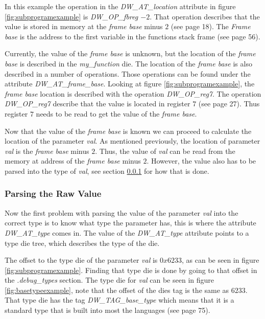 In this example the operation in the \emph{DW\_AT\_location} attribute in figure \ref{fig:subprogramexample} is \emph{DW\_OP\_fbreg $-2$}.
That operation describes that the value is stored in memory at the \emph{frame base} minus $2$ (see \cite{dwarf} page 18).
The \emph{Frame base} is the address to the first variable in the functions stack frame (see \cite{dwarf} page 56).


Currently, the value of the \emph{frame base} is unknown, but the location of the \emph{frame base}  is described in the \emph{my\_function} \gls{die}.
The location of the \emph{frame base} is also described in a number of operations.
Those operations can be found under the attribute \emph{DW\_AT\_frame\_base}.
Looking at figure \ref{fig:subprogramexample}, the \emph{frame base} location is described with the operation \emph{DW\_OP\_reg7}.
The operation \emph{DW\_OP\_reg7} describe that the value is located in register $7$ (see \cite{dwarf} page 27).
Thus register $7$ needs to be read to get the value of the \emph{frame base}.


Now that the value of the \emph{frame base} is known we can proceed to calculate the location of the parameter \emph{val}.
As mentioned previously, the location of parameter \emph{val} is the \emph{frame base} minus $2$.
Thus, the value of \emph{val} can be read from the memory at address of the \emph{frame base} minus $2$.
However, the value also has to be parsed into the type of \emph{val}, see section \ref{sec:parsingvalue} for how that is done.


\subsubsection{Parsing the Raw Value} \label{sec:parsingvalue}
Now the first problem with parsing the value of the parameter \emph{val} into the correct type is to know what type the parameter has, this is where the attribute \emph{DW\_AT\_type} comes in.
The value of the \emph{DW\_AT\_type} attribute points to a type \gls{die} tree, which describes the type of the \gls{die}.


The offset to the type \gls{die} of the parameter \emph{val} is $0x6233$, as can be seen in figure \ref{fig:subprogramexample}.
Finding that type \gls{die} is done by going to that offset in the \emph{.debug\_types} section.
The type \gls{die} for \emph{val} can be seen in figure \ref{fig:basetypeexample}, note that the offset of the \glspl{die} tag is the same as $6233$.
That type \gls{die} has the tag \emph{DW\_TAG\_base\_type} which means that it is a standard type that is built into most the languages (see \cite{dwarf} page 75).


